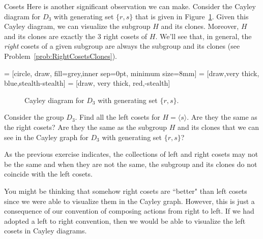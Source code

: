 \begin{section}{Cosets}
Here is another significant observation we can make.  Consider the Cayley diagram for $D_3$ with generating set $\{r,s\}$ that is given in Figure~\ref{fig:D3_repeat}. Given this Cayley diagram, we can visualize the subgroup $H$ and its clones.  Moreover, $H$ and its clones are exactly the 3 right cosets of $H$.  We'll see that, in general, the \emph{right} cosets of a given subgroup are always the subgroup and its clones (see Problem~\ref{prob:RightCosetsClones}).

 = [circle, draw, fill=grey,inner sep=0pt, minimum size=8mm]
 = [draw,very  thick, blue,stealth-stealth]
 = [draw, very thick, red,-stealth]

\begin{figure}[!ht]
\centering
{}
\caption{Cayley diagram for $D_3$ with generating set $\{r,s\}$.}
\label{fig:D3_repeat}
\end{figure}

\begin{exercise}\label{exer:left_cosets_D3}
Consider the group $D_3$.  Find all the left cosets for $H=\langle s\rangle$.  Are they the same as the right cosets?  Are they the same as the subgroup $H$ and its clones that we can see in the Cayley graph for $D_3$ with generating set $\{r,s\}$?
\end{exercise}

As the previous exercise indicates, the collections of left and right cosets may not be the same and when they are not the same, the subgroup and its clones do not coincide with the left cosets.

You might be thinking that somehow right cosets are ``better" than left cosets since we were able to visualize them in the Cayley graph.  However, this is just a consequence of our convention of composing actions from right to left.  If we had adopted a left to right convention, then we would be able to visualize the left cosets in Cayley diagrams.  


\end{section}
